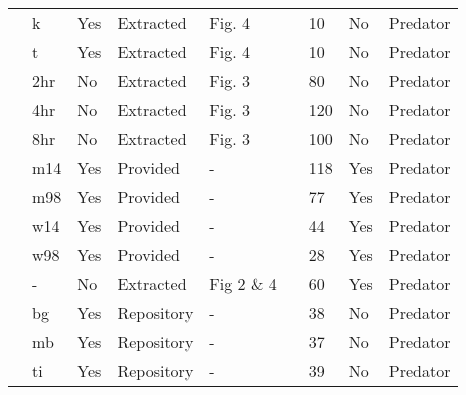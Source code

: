 \begin{longtable}{lllllllll}
\citet{Vahl:2005aa}&k&Yes&Extracted&Fig. 4&\citet{Novak:2020aa}&10&No&Predator\tabularnewline
\citet{Vahl:2005aa}&t&Yes&Extracted&Fig. 4&\citet{Novak:2020aa}&10&No&Predator\tabularnewline
\citet{Von-Westernhagen:1976aa}&2hr&No&Extracted&Fig. 3&\citet{Novak:2020aa}&80&No&Predator\tabularnewline
\citet{Von-Westernhagen:1976aa}&4hr&No&Extracted&Fig. 3&\citet{Novak:2020aa}&120&No&Predator\tabularnewline
\citet{Von-Westernhagen:1976aa}&8hr&No&Extracted&Fig. 3&\citet{Novak:2020aa}&100&No&Predator\tabularnewline
\citet{Vucetich:2002aa}&m14&Yes&Provided&-&&118&Yes&Predator\tabularnewline
\citet{Vucetich:2002aa}&m98&Yes&Provided&-&&77&Yes&Predator\tabularnewline
\citet{Vucetich:2002aa}&w14&Yes&Provided&-&&44&Yes&Predator\tabularnewline
\citet{Vucetich:2002aa}&w98&Yes&Provided&-&&28&Yes&Predator\tabularnewline
\citet{Walde:1984aa}&-&No&Extracted&Fig 2 \& 4&\citet{Novak:2020aa}&60&Yes&Predator\tabularnewline
\citet{Wasserman:2016aa}&bg&Yes&Repository&-&\citet{Wasserman:2016ab}&38&No&Predator\tabularnewline
\citet{Wasserman:2016aa}&mb&Yes&Repository&-&\citet{Wasserman:2016ab}&37&No&Predator\tabularnewline
\citet{Wasserman:2016aa}&ti&Yes&Repository&-&\citet{Wasserman:2016ab}&39&No&Predator\tabularnewline
\hline
\end{longtable}

